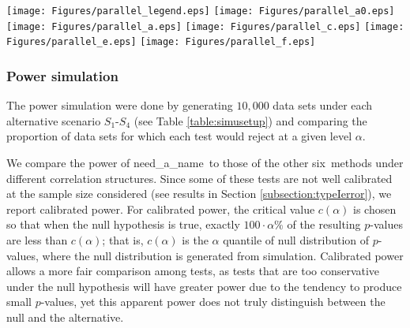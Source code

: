 \documentclass[useAMS,usenatbib, galley]{biom}
\newcommand{\OurMethod}{need\_a\_name}
\newcommand{\HowmanyTest}{six}
\newcommand{\aaCase}{a}
\newcommand{\fCase}{e}
\begin{document}
	
	\begin{figure*}[!th]
		\begin{center}
			\texttt{[image: Figures/parallel\_legend.eps]}
			\texttt{[image: Figures/parallel\_a0.eps]}
			\texttt{[image: Figures/parallel\_a.eps]}
			\texttt{[image: Figures/parallel\_c.eps]}
			\texttt{[image: Figures/parallel\_e.eps]}
			\texttt{[image: Figures/parallel\_f.eps]}
		\end{center} 
	\caption{Uniform quantile-quantile plots for $p$-values by different methods. Each plot from top to bottom corresponds to correlation structures (\aaCase)-(\fCase), respectively. The left column is for group $A_1$ simulation, and the right column for group $A_2$ simulation (see Table \ref{table:simusetup} for detail). Results are based on 10,000 simulations.}\label{fig:typeIerror}
	\end{figure*} 

	
	\subsubsection{Power simulation}\label{subsection:power}		 

	The power simulation were done by generating $10,000$ data sets under each alternative scenario $S_1$-$S_4$ (see Table \ref{table:simusetup}) and comparing the proportion of data sets for which each test would reject at a given level $\alpha$. 
	
	We compare the power of \OurMethod~to those of the other \HowmanyTest~methods under different correlation structures. Since some of these tests are not well calibrated at the sample size considered (see results in Section \ref{subsection:typeIerror}), we report calibrated power. For calibrated power, the critical value $c(\alpha)$ is chosen so that when the null hypothesis is true, exactly $100\cdot\alpha\%$ of the resulting $p$-values are less than $c(\alpha)$; that is, $c(\alpha)$ is  the $\alpha$ quantile of null distribution of $p$-values, where the null distribution is generated from simulation. Calibrated power allows a more fair comparison among tests, as tests that are too conservative under the null hypothesis will have greater power due to the tendency to produce small $p$-values, yet this apparent power does not truly distinguish between the null and the alternative.  
	
\end{document}
